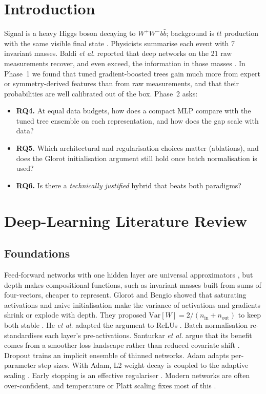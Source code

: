\documentclass[conference]{IEEEtran}
\begin{document}
\section{Introduction}
Signal is a heavy Higgs boson decaying to $W^+W^-b\bar b$; background is $t\bar t$ production with
the same visible final state \cite{baldi2014searching}. Physicists summarise each event with 7
invariant masses. Baldi \emph{et al.} reported that deep networks on the 21 raw measurements
recover, and even exceed, the information in those masses \cite{baldi2014searching}. In Phase~1 we
found that tuned gradient-boosted trees gain much more from expert or symmetry-derived features than
from raw measurements, and that their probabilities are well calibrated out of the box.
Phase~2 asks:
\begin{itemize}
\item \textbf{RQ4.} At equal data budgets, how does a compact MLP compare with the tuned tree ensemble on each representation, and how does the gap scale with data?
\item \textbf{RQ5.} Which architectural and regularisation choices matter (ablations), and does the Glorot initialisation argument still hold once batch normalisation is used?
\item \textbf{RQ6.} Is there a \emph{technically justified} hybrid that beats both paradigms?
\end{itemize}

\section{Deep-Learning Literature Review}\label{sec:lit}
\subsection{Foundations}
Feed-forward networks with one hidden layer are universal approximators \cite{hornik1989multilayer},
but depth makes compositional functions, such as invariant masses built from sums of four-vectors,
cheaper to represent. Glorot and Bengio showed that saturating activations and naive initialisation
make the variance of activations and gradients shrink or explode with depth. They proposed
$\mathrm{Var}[W]=2/(n_\mathrm{in}+n_\mathrm{out})$ to keep both stable \cite{glorot2010understanding}.
He \emph{et al.} adapted the argument to ReLUs \cite{he2015delving}. Batch normalisation
\cite{ioffe2015batch} re-standardises each layer's pre-activations. Santurkar \emph{et al.} argue that
its benefit comes from a smoother loss landscape rather than reduced covariate shift
\cite{santurkar2018how}. Dropout \cite{srivastava2014dropout} trains an implicit ensemble of thinned
networks. Adam \cite{kingma2015adam} adapts per-parameter step sizes. With Adam, L2 weight decay is
coupled to the adaptive scaling \cite{loshchilov2019decoupled}. Early stopping is an effective
regulariser \cite{prechelt1998early}. Modern networks are often over-confident, and temperature or
Platt scaling fixes most of this \cite{guo2017calibration}.
\end{document}
